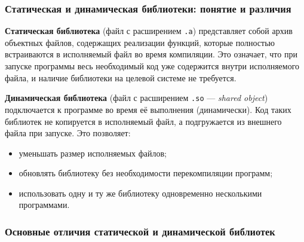 \subsubsection{Статическая и динамическая библиотеки: понятие и различия}

\textbf{Статическая библиотека} (файл с расширением \texttt{.a}) представляет собой архив объектных файлов, содержащих реализации функций, которые полностью встраиваются в исполняемый файл во время компиляции. Это означает, что при запуске программы весь необходимый код уже содержится внутри исполняемого файла, и наличие библиотеки на целевой системе не требуется.

\textbf{Динамическая библиотека} (файл с расширением \texttt{.so} — \textit{shared object}) подключается к программе во время её выполнения (динамически). Код таких библиотек не копируется в исполняемый файл, а подгружается из внешнего файла при запуске. Это позволяет:
\begin{itemize}[noitemsep]
  \item уменьшать размер исполняемых файлов;
  \item обновлять библиотеку без необходимости перекомпиляции программ;
  \item использовать одну и ту же библиотеку одновременно несколькими программами.
\end{itemize}

\subsubsection*{Основные отличия статической и динамической библиотек}

